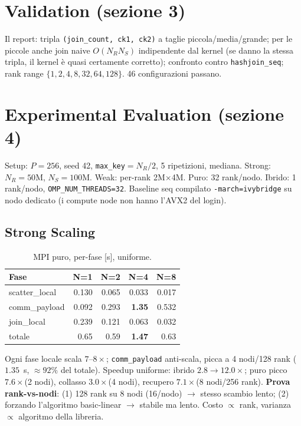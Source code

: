 \documentclass[11pt,a4paper]{article}
\begin{document}
\section{Validation (sezione 3)}

Il report: tripla \texttt{(join\_count, ck1, ck2)} a taglie piccola/media/grande; per le piccole anche join naive $O(N_R N_S)$ indipendente dal kernel (se danno la stessa tripla, il kernel è quasi certamente corretto); confronto contro \texttt{hashjoin\_seq}; rank range $\{1,2,4,8,32,64,128\}$. 46 configurazioni passano.

\section{Experimental Evaluation (sezione 4)}

Setup: $P=256$, seed 42, \texttt{max\_key}$=N_R/2$, 5 ripetizioni, mediana. Strong: $N_R=50$M, $N_S=100$M. Weak: per-rank 2M$\times$4M. Puro: 32 rank/nodo. Ibrido: 1 rank/nodo, \texttt{OMP\_NUM\_THREADS=32}. Baseline seq compilato \texttt{-march=ivybridge} su nodo dedicato (i compute node non hanno l'AVX2 del login).

\subsection{Strong Scaling}

\begin{table}[H]\centering\small
\begin{tabular}{@{}lrrrr@{}}\toprule
Fase & N=1 & N=2 & N=4 & N=8 \\\midrule
scatter\_local & 0.130 & 0.065 & 0.033 & 0.017 \\
comm\_payload & 0.092 & 0.293 & \textbf{1.35} & 0.532 \\
join\_local & 0.239 & 0.121 & 0.063 & 0.032 \\
totale & 0.65 & 0.59 & \textbf{1.47} & 0.63 \\\bottomrule
\end{tabular}\caption{MPI puro, per-fase [s], uniforme.}
\end{table}

\begin{difesa}
Ogni fase locale scala $7$--$8\times$; \texttt{comm\_payload} anti-scala, picca a 4 nodi/128 rank ($1.35$~s, $\approx92\%$ del totale). Speedup uniforme: ibrido $2.8\to12.0\times$; puro picco $7.6\times$(2 nodi), collasso $3.0\times$(4 nodi), recupero $7.1\times$(8 nodi/256 rank). \textbf{Prova rank-vs-nodi}: (1) 128 rank su 8 nodi (16/nodo) $\to$ stesso scambio lento; (2) forzando l'algoritmo basic-linear $\to$ stabile ma lento. Costo $\propto$ rank, varianza $\propto$ algoritmo della libreria.
\end{difesa}
\end{document}
